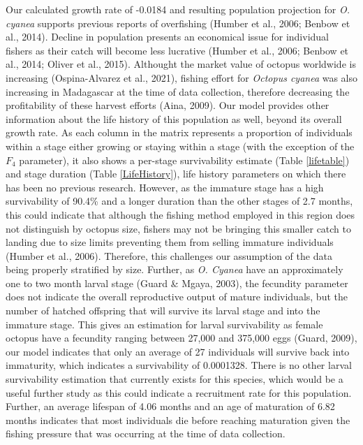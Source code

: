 \documentclass[
  12pt,
]{article}
\begin{document}
Our calculated growth rate of -0.0184 and resulting population projection for \emph{O. cyanea} supports previous reports of overfishing (Humber et al., 2006; Benbow et al., 2014). Decline in population presents an economical issue for individual fishers as their catch will become less lucrative (Humber et al., 2006; Benbow et al., 2014; Oliver et al., 2015). Althought the market value of octopus worldwide is increasing (Ospina-Alvarez et al., 2021), fishing effort for \emph{Octopus cyanea} was also increasing in Madagascar at the time of data collection, therefore decreasing the profitability of these harvest efforts (Aina, 2009). Our model provides other information about the life history of this population as well, beyond its overall growth rate. As each column in the matrix represents a proportion of individuals within a stage either growing or staying within a stage (with the exception of the \(F_4\) parameter), it also shows a per-stage survivability estimate (Table \ref{lifetable}) and stage duration (Table \ref{LifeHistory}), life history parameters on which there has been no previous research. However, as the immature stage has a high survivability of 90.4\% and a longer duration than the other stages of 2.7 months, this could indicate that although the fishing method employed in this region does not distinguish by octopus size, fishers may not be bringing this smaller catch to landing due to size limits preventing them from selling immature individuals (Humber et al., 2006). Therefore, this challenges our assumption of the data being properly stratified by size. Further, as \emph{O. Cyanea} have an approximately one to two month larval stage (Guard \& Mgaya, 2003), the fecundity parameter does not indicate the overall reproductive output of mature individuals, but the number of hatched offspring that will survive its larval stage and into the immature stage. This gives an estimation for larval survivability as female octopus have a fecundity ranging between 27,000 and 375,000 eggs (Guard, 2009), our model indicates that only an average of 27 individuals will survive back into immaturity, which indicates a survivability of 0.0001328. There is no other larval survivability estimation that currently exists for this species, which would be a useful further study as this could indicate a recruitment rate for this population. Further, an average lifespan of 4.06 months and an age of maturation of 6.82 months indicates that most individuals die before reaching maturation given the fishing pressure that was occurring at the time of data collection.
\end{document}
